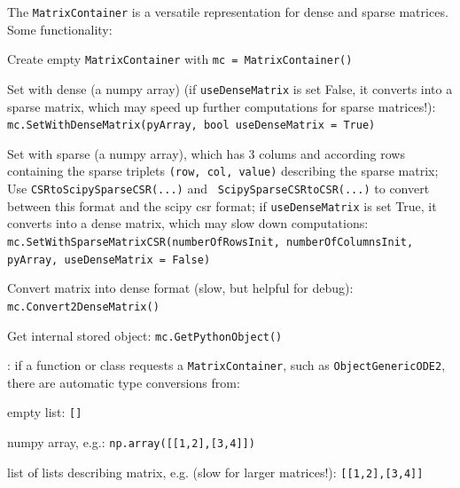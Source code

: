 \label{sec:MatrixContainer}
The \texttt{MatrixContainer} is a versatile representation for dense and sparse matrices.
Some functionality:
\bi
  \item Create empty \texttt{MatrixContainer} with \texttt{mc = MatrixContainer()}
  \item Set with dense  (a numpy array) (if \texttt{useDenseMatrix} is set False, it converts into a sparse matrix, which may speed up further computations for sparse matrices!): \texttt{mc.SetWithDenseMatrix(pyArray, bool useDenseMatrix = True)}
  \item Set with sparse  (a numpy array), which has 3 colums and according rows containing the sparse triplets \texttt{(row, col, value)} describing the sparse matrix; Use \texttt{CSRtoScipySparseCSR(...)} and \texttt{ ScipySparseCSRtoCSR(...)} to convert between this format and the scipy csr format; if \texttt{useDenseMatrix} is set True, it converts into a dense matrix, which may slow down computations: \texttt{mc.SetWithSparseMatrixCSR(numberOfRowsInit, numberOfColumnsInit, pyArray, useDenseMatrix = False)}
  \item Convert matrix into dense format (slow, but helpful for debug): \texttt{mc.Convert2DenseMatrix()}
  \item Get internal stored object: \texttt{mc.GetPythonObject()}
  \item {}: if a function or class requests a \texttt{MatrixContainer}, such as \texttt{ObjectGenericODE2}, there are automatic type conversions from:
  \bi
    \item empty list: \texttt{[]}
    \item numpy array, e.g.: \texttt{np.array([[1,2],[3,4]])}
    \item list of lists describing matrix, e.g. (slow for larger matrices!): \texttt{[[1,2],[3,4]]}
  \ei
\ei

